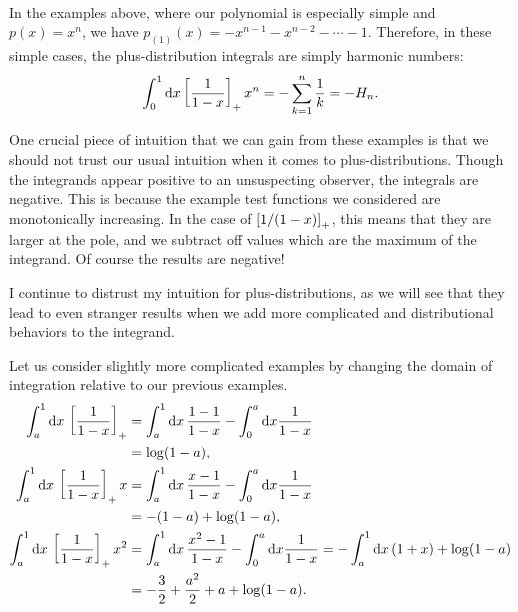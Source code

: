 \begin{subappendices}
~\\
\begin{example}{}
    In the examples above, where our polynomial is especially simple and \(p(x) = x^n\), we have \(p_{(1)}(x) = -x^{n-1} - x^{n-2} - \cdots - 1\).
    Therefore, in these simple cases, the plus-distribution integrals are simply harmonic numbers:
    \begin{align}
        \int_{0}^{1} \dd x \left[\frac{1}{1-x}\right]_+ x^n
        =
        -\sum_{k=1}^n \frac{1}{k}
        =
        -H_n.
    \end{align}
\end{example}

One crucial piece of intuition that we can gain from these examples is that we should not trust our usual intuition when it comes to plus-distributions.
%
Though the integrands appear positive to an unsuspecting observer, the integrals are negative.
%
This is because the example test functions we considered are monotonically increasing.
%
In the case of \(\left[1/(1-x)\right]_+\), this means that they are larger at the pole, and we subtract off values which are the maximum of the integrand.
%
Of course the results are negative!

I continue to distrust my intuition for plus-distributions, as we will see that they lead to even stranger results when we add more complicated and distributional behaviors to the integrand.


Let us consider slightly more complicated examples by changing the domain of integration relative to our previous examples.
\begin{align}
    \int_{a}^{1} \dd x\,\left[\frac{1}{1-x}\right]_+
    &=
    \int_{a}^{1} \dd x\,\frac{1-1}{1-x} - \int_0^a \dd x \frac{1}{1-x}
    \\
    &=
    \log(1-a)
    \notag
    ,
    \\
    \int_{a}^{1} \dd x\,\left[\frac{1}{1-x}\right]_+ x
    &=
    \int_{a}^{1} \dd x\,\frac{x-1}{1-x} - \int_0^a \dd x \frac{1}{1-x}
    \\
    &=
    -(1 - a) + \log(1-a)
    \notag
    ,
    \\
    \int_{a}^{1} \dd x\,\left[\frac{1}{1-x}\right]_+ x^2
    &=
    \int_{a}^{1} \dd x\,\frac{x^2 - 1}{1-x} - \int_0^a \dd x \frac{1}{1-x}
    =
    -\int_a^1 \dd x\, (1+x) + \log(1-a)
    \\
    \notag
    &= -\frac{3}{2} + \frac{a^2}{2} + a + \log(1-a)
    .
\end{align}


\end{subappendices}

